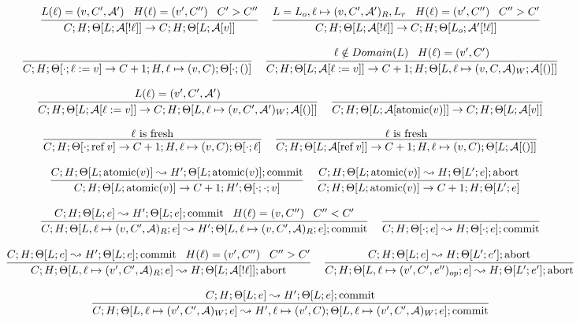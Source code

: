 \documentclass[9pt]{article}
\newcommand{\aeval}[1]{\mathcal{A}[#1]}
\newcommand{\actxt}[0]{\mathcal{A}}
\newcommand{\loc}[0]{\ell}
\newcommand{\atomic}[1]{\text{atomic}(#1)}
\newcommand{\alloc}[1]{\text{ref} \; #1}
\newcommand{\commit}[0]{\text{commit}}
\newcommand{\abort}[0]{\text{abort}}
\begin{document}
\[%
\infer[]{C; H; \Theta[L; \aeval{!\loc}] \rightarrow C; H; \Theta[L; \aeval{v}]}{L(\loc) = (v, C', \actxt') \;\;\; H(\loc) = (v', C'') \;\;\; C' > C''} \;\;\;
\infer[]{C; H; \Theta[L; \aeval{!\loc}] \rightarrow C; H; \Theta[L_o; \actxt'[!\loc]]}{L = L_o, \loc \mapsto (v, C', \actxt')_R, L_r  \;\;\; H(\loc) = (v', C'') \;\;\; C'' > C'} 
\]

\[%
\infer[]{C; H; \Theta[\cdot; \loc := v] \rightarrow C+1; H, \loc \mapsto (v, C); \Theta[\cdot; ()]}{}\;\;\;
\infer[]{C; H; \Theta[L; \aeval{\loc := v}] \rightarrow C+1; H; \Theta[L, \loc \mapsto (v, C, \actxt)_W; \aeval{()}]}{\loc \notin Domain(L) \;\;\; H(\loc) = (v', C')} 
\]

\[%
\infer[]{C; H; \Theta[L; \aeval{\loc := v}] \rightarrow C; H; \Theta[L, \loc \mapsto (v, C', \actxt')_W; \aeval{()}]}{L(\loc) =  (v', C', \actxt')} \;\;\;
\infer[]{C; H; \Theta[L; \aeval{\atomic{v}}] \rightarrow C; H; \Theta[L; \aeval{v}]}{}
\]

\[%
\infer[]{C; H; \Theta[\cdot; \alloc{v}] \rightarrow C+1; H, \loc \mapsto (v, C); \Theta[\cdot; \loc]}{\loc \text{ is fresh}} \;\;\;
\infer[]{C; H; \Theta[L; \aeval{\alloc{v}}] \rightarrow C+1; H, \loc \mapsto (v, C); \Theta[L;  \aeval{()}]}{\loc \text{ is fresh}}
\]

\[%
\infer[]{C; H; \Theta[L; \atomic{v}] \rightarrow C+1; H'; \Theta[\cdot;\cdot; v]}{C; H; \Theta[L; \atomic{v}] \leadsto H'; \Theta[L; \atomic{v}]; \commit} \;\;\;
\infer[]{C; H; \Theta[L; \atomic{v}] \rightarrow C+1; H; \Theta[L'; e]}{C; H; \Theta[L; \atomic{v}] \leadsto H; \Theta[L'; e]; \abort} \;\;\;
\]

\boxed{C; H; \Theta[L; e] \leadsto H', \Theta[L'; e']; (\abort | \commit)}

\[%
\infer[]{C; H; \Theta[L, \loc \mapsto (v, C', \actxt)_R; e] \leadsto H'; \Theta[L, \loc \mapsto (v, C', \actxt)_R;e]; \commit}{C; H; \Theta[L; e] \leadsto H'; \Theta[L; e]; \commit \;\;\; H(\loc) = (v, C'') \;\;\; C'' < C'} \;\;\;
\infer[]{C;H;\Theta[\cdot;e] \leadsto H; \Theta[\cdot;e]; \commit}{}
\]

\[%
\infer[]{C; H; \Theta[L, \loc \mapsto (v', C',\actxt)_R; e] \leadsto H; \Theta[L; \aeval{!\loc}]; \abort}{C; H; \Theta[L; e] \leadsto H'; \Theta[L; e]; \commit \;\;\; H(\loc) = (v', C'') \;\;\; C'' > C'} \;\;\;
\infer[]{C; H; \Theta[L, \loc \mapsto (v', C',e'')_{op}; e] \leadsto H; \Theta[L'; e']; \abort}{C; H; \Theta[L; e] \leadsto H; \Theta[L'; e']; \abort} 
\]

\[%
\infer[]{C; H; \Theta[L, \loc \mapsto (v', C', \actxt)_W; e] \leadsto H', \loc \mapsto (v', C); \Theta[L, \loc \mapsto (v', C', \actxt)_W; e]; \commit}{C; H; \Theta[L; e] \leadsto H'; \Theta[L; e]; \commit} 
\]

\endgroup
\end{document}
